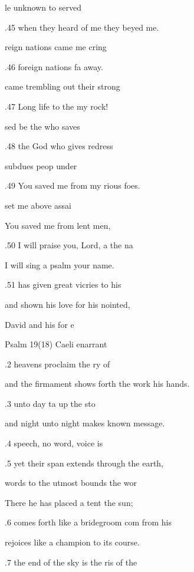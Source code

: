 le unknown to  served  

.45 when they heard of me they beyed me. 

reign nations came  me cring 

.46 foreign nations fa away. 

 came trembling out  their strong 

.47 Long life to the  my rock! 

sed be the  who saves  

.48 the God who gives  redress 

 subdues peop under  

.49 You saved me from my rious foes. 

 set me above  assai 

You saved me from lent men, 

.50  I will praise you, Lord, a the na 

I will sing a psalm  your name. 

.51  has given great vicries to his  

and shown his love for his nointed, 

 David and his  for e 

Psalm 19(18) Caeli enarrant 


.2  heavens proclaim the ry of  

and the firmament shows forth the work  his hands. 

.3  unto day ta up the sto 

and night unto night makes known  message. 

.4  speech, no word,  voice is  

.5 yet their span extends through  the earth, 

 words to the utmost bounds  the wor 

There he has placed a tent  the sun; 

.6  comes forth like a bridegroom com from his  

rejoices like a champion to  its course. 

.7  the end of the sky is the ris of the  

